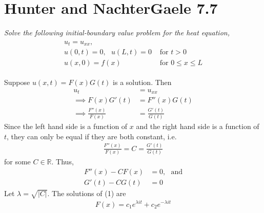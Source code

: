 \documentclass[12pt]{article}
\theoremstyle{plain}
\begin{document}
\section*{Hunter and NachterGaele 7.7}
\emph{Solve the following initial-boundary value problem for the heat equation,}
\begin{align*}
    \begin{array}{ll}
    u_t = u_{xx}, & \\
    u(0, t) = 0,\ \ \ u(L,t) = 0 & \text{ for } t > 0 \\
    u(x, 0) = f(x) & \text{ for } 0 \leq x \leq L
    \end{array}
\end{align*}

Suppose $u(x,t) = F(x)G(t)$ is a solution.  Then
\begin{align*}
    u_t &= u_{xx} \\
    \implies F(x)G'(t) &= F''(x)G(t) \\
    \implies \frac{F''(x)}{F(x)} &= \frac{G'(t)}{G(t)}
\end{align*}
Since the left hand side is a function of $x$ and the right hand side is a function of $t$, they can only be equal if they are both constant, i.e.
\begin{align*}
    \frac{F''(x)}{F(x)} = C = \frac{G'(t)}{G(t)}
\end{align*}
for some $C \in \mathbb{R}$.  Thus,
\begin{align}
    F''(x) - C F(x) &= 0,\ \ \ \text{and} \\
    G'(t) - C G(t) &= 0
\end{align}
Let $\lambda = \sqrt{|C|}$.  The solutions of (1) are
\begin{align*}
    F(x) = c_1 e^{\lambda it} + c_2 e^{-\lambda it}
\end{align*}
\end{document}
